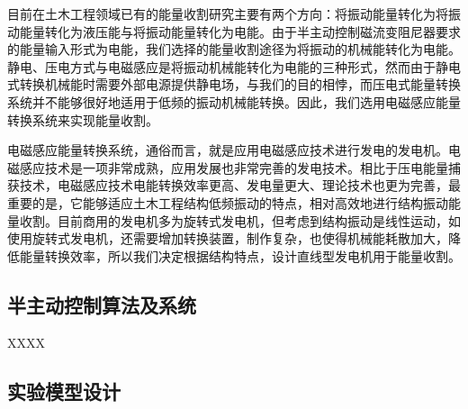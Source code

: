 目前在土木工程领域已有的能量收割研究主要有两个方向：将振动能量转化为将振动能量转化为液压能与将振动能量转化为电能。由于半主动控制磁流变阻尼器要求的能量输入形式为电能，我们选择的能量收割途径为将振动的机械能转化为电能。静电、压电方式与电磁感应是将振动机械能转化为电能的三种形式，然而由于静电式转换机械能时需要外部电源提供静电场，与我们的目的相悖，而压电式能量转换系统并不能够很好地适用于低频的振动机械能转换。因此，我们选用电磁感应能量转换系统来实现能量收割。

电磁感应能量转换系统，通俗而言，就是应用电磁感应技术进行发电的发电机。电磁感应技术是一项非常成熟，应用发展也非常完善的发电技术。相比于压电能量捕获技术，电磁感应技术电能转换效率更高、发电量更大、理论技术也更为完善，最重要的是，它能够适应土木工程结构低频振动的特点，相对高效地进行结构振动能量收割。目前商用的发电机多为旋转式发电机，但考虑到结构振动是线性运动，如使用旋转式发电机，还需要增加转换装置，制作复杂，也使得机械能耗散加大，降低能量转换效率，所以我们决定根据结构特点，设计直线型发电机用于能量收割。

\subsection{半主动控制算法及系统}
XXXX

\subsection{实验模型设计}